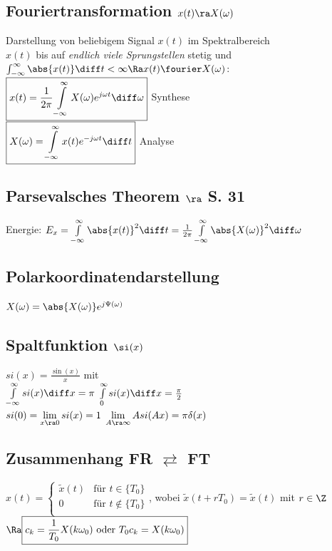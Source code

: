 \documentclass[6pt,a4paper]{scrartcl}
\begin{document}
\begin{multicols}{4}
	\section{Fouriertransformation $x(t) \ra X(\omega)$}
	Darstellung von beliebigem Signal $x(t)$ im Spektralbereich\\
	$x(t)$ bis auf \emph{endlich viele Sprungstellen} stetig und $\int_{-\infty}^{\infty}{\abs{x(t)} \diff t} < \infty \Ra x(t) \fourier X(\omega)$:\\
	$\boxed{
		x(t) = \frac{1}{2 \pi}\int\limits_{-\infty}^{\infty}{X(\omega) e^{j \omega t} \diff \omega}
	}$ \hfill Synthese\\
	$\boxed{
		X(\omega) = \int\limits_{-\infty}^{\infty}{x(t) e^{-j \omega t} \diff t}
	}$ \hfill Analyse
		
		\subsection*{Parsevalsches Theorem $\ra$ S. 31}
		Energie: $E_x = \int\limits_{-\infty}^{\infty}{\abs{x(t)}^2 \diff t} = \frac{1}{2 \pi}\int\limits_{-\infty}^{\infty}{\abs{X(\omega)}^2 \diff \omega}$
		
		\subsection*{Polarkoordinatendarstellung}
		$X(\omega) = \abs{X(\omega)} e^{j \Psi(\omega)}$
		
		\subsection*{Spaltfunktion $\si(x)$}
		$si(x) = \frac{\sin{(x)}}{x}$ mit\\
		$\int\limits_{-\infty}^{\infty}{si(x) \diff x} = \pi$ \hfill $\int\limits_{0}^{\infty}{si(x) \diff x} = \frac{\pi}{2}$\\
		$si(0) = \lim\limits_{x \ra 0}{si(x)} = 1$ \hfill $\lim\limits_{A \ra \infty}{A si(A x)} = \pi \delta(x)$
		
		\subsection*{Zusammenhang FR $\rightleftarrows$ FT}
		$x(t) = \begin{cases}
			\tilde{x}(t) & \text{für } t \in \{T_0\}\\
			0 & \text{für } t \notin \{T_0\}\\
		\end{cases}$, wobei $\tilde{x}(t + r T_0) = \tilde{x}(t)$ mit $r \in \Z$\\
		$\Ra \boxed{
			c_k = \frac{1}{T_0} X(k \omega_0) \text{ oder } T_0 c_k = X(k \omega_0)	
		}$
		

\end{multicols}
\end{document}
